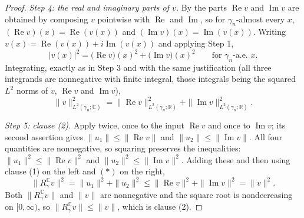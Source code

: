 \begin{proof}
\emph{Step 4: the real and imaginary parts of $v$.}
By  the parts $\operatorname{Re} v$ and
$\operatorname{Im} v$ are obtained by composing $v$ pointwise with
$\operatorname{Re}$ and $\operatorname{Im}$, so for $\gamma_n$-almost every $x$,
$(\operatorname{Re} v)(x) = \operatorname{Re}(v(x))$ and
$(\operatorname{Im} v)(x) = \operatorname{Im}(v(x))$.  Writing
$v(x) = \operatorname{Re}(v(x)) + i \operatorname{Im}(v(x))$ and applying Step 1,
\[
  |v(x)|^2 = \bigl(\operatorname{Re} v\bigr)(x)^2
    + \bigl(\operatorname{Im} v\bigr)(x)^2
  \qquad\text{for } \gamma_n\text{-a.e. } x .
\]
Integrating, exactly as in Step 3 and with the same justification (all three
integrands are nonnegative with finite integral, those integrals being the
squared $L^2$ norms of $v$, $\operatorname{Re} v$ and $\operatorname{Im} v$),
\begin{equation*}
  \|v\|_{L^2(\gamma_n;\mathbb{C})}^2
    = \|\operatorname{Re} v\|_{L^2(\gamma_n;\mathbb{R})}^2
      + \|\operatorname{Im} v\|_{L^2(\gamma_n;\mathbb{R})}^2 . \tag{$*$}
\end{equation*}

\emph{Step 5: clause (2).}
Apply  twice, once to the input $\operatorname{Re} v$
and once to $\operatorname{Im} v$; its second assertion gives
$\|u_1\| \leq \|\operatorname{Re} v\|$ and $\|u_2\| \leq \|\operatorname{Im} v\|$.
All four quantities are nonnegative, so squaring preserves the inequalities:
$\|u_1\|^2 \leq \|\operatorname{Re} v\|^2$ and
$\|u_2\|^2 \leq \|\operatorname{Im} v\|^2$.  Adding these and then using clause
(1) on the left and $(*)$ on the right,
\[
  \bigl\|R_\gamma^{\mathbb{C}} v\bigr\|^2
    = \|u_1\|^2 + \|u_2\|^2
    \leq \|\operatorname{Re} v\|^2 + \|\operatorname{Im} v\|^2
    = \|v\|^2 .
\]
Both $\|R_\gamma^{\mathbb{C}} v\|$ and $\|v\|$ are nonnegative and the square
root is nondecreasing on $[0,\infty)$, so
$\|R_\gamma^{\mathbb{C}} v\| \leq \|v\|$, which is clause (2).
\end{proof}
